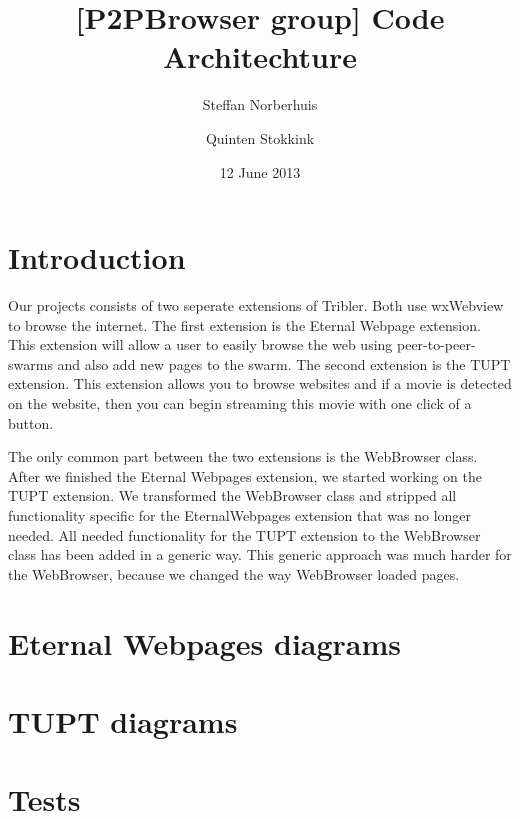 \documentclass[a4paper,11pt]{article}
\title{[P2PBrowser group] Code Architechture}
\author{Steffan Norberhuis \and Quinten Stokkink}
\date{12 June 2013}
\begin{document}
   \maketitle

\section{Introduction}
Our projects consists of two seperate extensions of Tribler. Both use wxWebview to browse the internet.
The first extension is the Eternal Webpage extension.
This extension will allow a user to easily browse the web using peer-to-peer-swarms and also add new pages to the swarm.
The second extension is the TUPT extension.
This extension allows you to browse websites and if a movie is detected on the website,
then you can begin streaming this movie with one click of a button.

The only common part between the two extensions is the WebBrowser class.
After we finished the Eternal Webpages extension, we started working on the TUPT extension.
We transformed the WebBrowser class and stripped all functionality specific for the EternalWebpages extension that was no longer needed.
All needed functionality for the TUPT extension to the WebBrowser class has been added in a generic way.
This generic approach was much harder for the WebBrowser, because we changed the way WebBrowser loaded pages.

\section{Eternal Webpages diagrams}


\section{TUPT diagrams}


\section{Tests}

\end{document}
